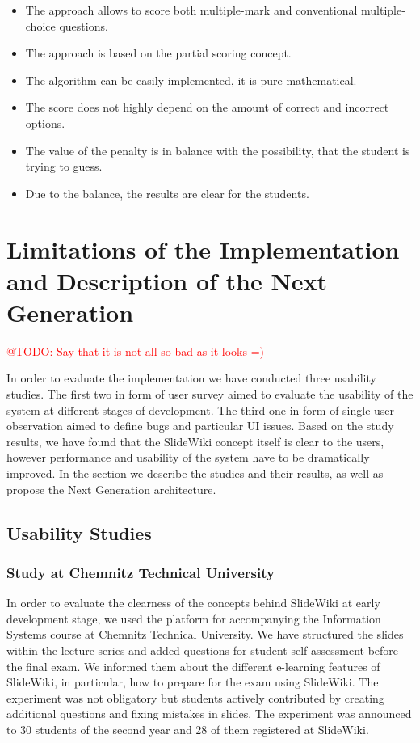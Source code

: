 \documentclass[ngerman,UKenglish,table]{scrbook}
\makeatletter
\newcommand{\todo}[1]{\textcolor{red}{@TODO: #1}}
\makeatother
\begin{document}
\begin{itemize}
  \item The approach allows to score both multiple-mark and conventional multiple-choice questions.
  \item The approach is based on the partial scoring concept.
  \item The algorithm can be easily implemented, it is pure mathematical.
  \item The score does not highly depend on the amount of correct and incorrect options.
  \item The value of the penalty is in balance with the possibility, that the student is trying to guess.
  \item Due to the balance, the results are clear for the students.  
\end{itemize}

\section{Limitations of the Implementation and Description of the Next Generation}
\label{slidewiki_limitations}

\todo{Say that it is not all so bad as it looks =)}

In order to evaluate the implementation we have conducted three usability studies.
The first two in form of user survey aimed to evaluate the usability of the system at different stages of development. 
The third one in form of single-user observation aimed to define bugs and particular UI issues.
Based on the study results, we have found that the SlideWiki concept itself is clear to the users, however performance and usability of the system have to be dramatically improved.
In the section we describe the studies and their results, as well as propose the Next Generation architecture.


\subsection{Usability Studies}

\subsubsection{Study at Chemnitz Technical University}
In order to evaluate the clearness of the concepts behind SlideWiki at early development stage, we used the platform for accompanying the Information Systems course at Chemnitz Technical University.
We have structured the slides within the lecture series and added questions for student self-assessment before the final exam.
We informed them about the different e-learning features of SlideWiki, in particular, how to prepare for the exam using SlideWiki.
The experiment was not obligatory but students actively contributed by creating additional questions and fixing mistakes in slides.
The experiment was announced to 30 students of the second year and 28 of them registered at SlideWiki.
\end{document}
